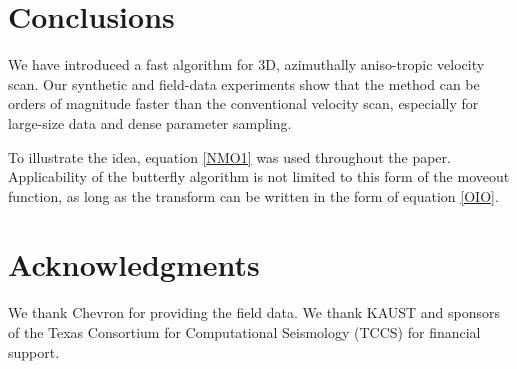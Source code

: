

\section{Conclusions}

We have introduced a fast algorithm for 3D, azimuthally aniso-tropic velocity scan. Our synthetic and field-data experiments show that the method can be orders of magnitude faster than the conventional velocity scan, especially for large-size data and dense parameter sampling. 

To illustrate the idea, equation \ref{NMO1} was used throughout the paper. Applicability of the butterfly algorithm is not limited to this form of the moveout function, as long as the transform can be written in the form of equation \ref{OIO}.



\section{Acknowledgments}

We thank Chevron for providing the field data. We thank KAUST and sponsors of the Texas Consortium for Computational Seismology (TCCS) for financial support. 
 





